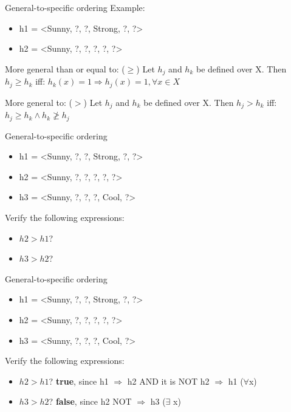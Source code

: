 \documentclass{beamer}
\begin{document}
\begin{frame}{General-to-specific ordering}
Example: 
\begin{itemize}
\item h1 = <Sunny, ?, ?, Strong, ?, ?>
\item h2 = <Sunny, ?, ?, ?, ?, ?>
\end{itemize}

\begin{block}{More general than or equal to: ($\geq$)}
Let $h_j$ and $h_k$ be defined over X. Then $h_j \geq h_k$ iff: %
\centering $h_k(x) = 1 \Rightarrow h_j(x) = 1, \forall x \in X$
\end{block}

\begin{block}{More general to: ($>$)}
Let $h_j$ and $h_k$ be defined over X. Then $h_j > h_k$ iff:
\centering $h_j \geq h_k \land h_k \ngeq h_j$ %
\end{block}
\end{frame}

\begin{frame}{General-to-specific ordering}
\begin{itemize}
\item h1 = <Sunny, ?, ?, Strong, ?, ?>
\item h2 = <Sunny, ?, ?, ?, ?, ?>
\item h3 = <Sunny, ?, ?, ?, Cool, ?>
\end{itemize}

Verify the following expressions:
\begin{itemize}
\item $h2 > h1$? %
\item $h3 > h2$? %
\end{itemize}
\end{frame}

\begin{frame}{General-to-specific ordering}
\begin{itemize}
\item h1 = <Sunny, ?, ?, Strong, ?, ?>
\item h2 = <Sunny, ?, ?, ?, ?, ?>
\item h3 = <Sunny, ?, ?, ?, Cool, ?>
\end{itemize}

Verify the following expressions:
\begin{itemize}
\item $h2 > h1$? \textbf{true}, since h1 $\Rightarrow$ h2 AND it is NOT h2 $\Rightarrow$ h1 ($\forall $x)
\item $h3 > h2$? \textbf{false}, since h2 NOT $\Rightarrow$ h3 ($\exists$ x)
\end{itemize}
\end{frame}
\end{document}
